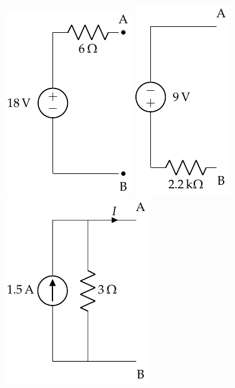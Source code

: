 \documentclass[10pt]{article}
\begin{document}
\includegraphics[scale=0.75]{figs/Conversion_Fuentes.pdf}
\hspace{1cm}
\includegraphics[scale=0.75]{figs/Conversion_Fuentes_2.pdf}
\hspace{1cm}
\includegraphics[scale=0.75]{figs/Conversion_Fuentes_3.pdf}
\end{document}

